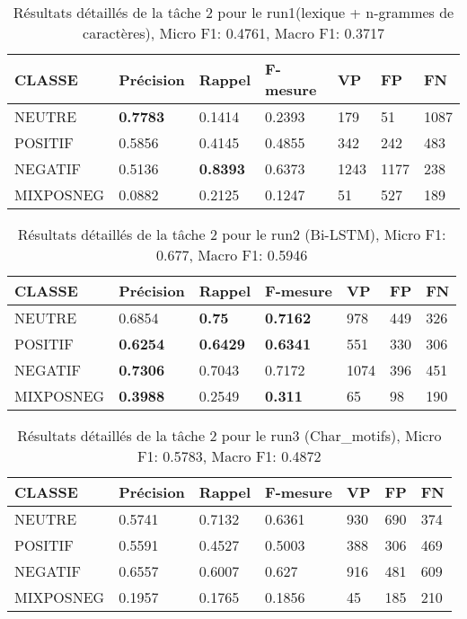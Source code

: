 
\begin{center}
\begin{table}
\begin{tabular}{l|l|l|l|l|l|l}
  CLASSE	&Précision	&Rappel	&F-mesure	&VP	&FP	&FN\\
\hline
\hline
  NEUTRE	&\textbf{0.7783}	&0.1414	&0.2393	&179	&51	&1087\\
  POSITIF	&0.5856	&0.4145	&0.4855	&342	&242	&483\\
  NEGATIF	&0.5136	&\textbf{0.8393}	&0.6373	&1243	&1177	&238\\
  MIXPOSNEG	&0.0882	&0.2125	&0.1247	&51	&527	&189\\
\hline
\end{tabular}
\caption{Résultats détaillés de la tâche 2 pour le run1(lexique + n-grammes de caractères),
  Micro F1: 0.4761, Macro F1: 0.3717\label{tab:detail1}}
\end{table}
\end{center}

\begin{center}
\begin{table}
\begin{tabular}{l|l|l|l|l|l|l}
  CLASSE	&Précision	&Rappel	&F-mesure	&VP	&FP	&FN\\
\hline
\hline
  NEUTRE	&0.6854	&\textbf{0.75}	&\textbf{0.7162}	&978	&449	&326\\
  POSITIF	&\textbf{0.6254}	&\textbf{0.6429}	&\textbf{0.6341}	&551	&330	&306\\
  NEGATIF	&\textbf{0.7306}	&0.7043	&0.7172	&1074	&396	&451\\
  MIXPOSNEG	&\textbf{0.3988}	&0.2549	&\textbf{0.311}	&65	&98	&190\\
\hline
\end{tabular}
\caption{Résultats détaillés de la tâche 2 pour le run2 (Bi-LSTM),
  Micro F1: 0.677, Macro F1: 0.5946\label{tab:detail2}}
\end{table}
\end{center}

\begin{center}
\begin{table}
\begin{tabular}{l|l|l|l|l|l|l}
  CLASSE	&Précision	&Rappel	&F-mesure	&VP	&FP	&FN\\
\hline
\hline
  NEUTRE	&0.5741	&0.7132	&0.6361	&930	&690	&374\\
  POSITIF	&0.5591	&0.4527	&0.5003	&388	&306	&469\\
  NEGATIF	&0.6557	&0.6007	&0.627	&916	&481	&609\\
  MIXPOSNEG	&0.1957	&0.1765	&0.1856	&45	&185	&210\\
\hline
\end{tabular}
\caption{Résultats détaillés de la tâche 2 pour le run3 (Char\_motifs),
  Micro F1: 0.5783, Macro F1: 0.4872\label{tab:detail3}}
\end{table}
\end{center}


